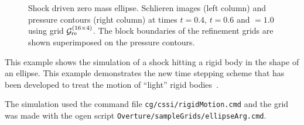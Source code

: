 {\begin{figure}[htb]
\begin{center}
\end{center}
  \caption{Shock driven zero mass ellipse. Schlieren images (left column) and pressure contours (right column)
 at times $t=0.4$, $t=0.6$ and $=1.0$ using grid ${\mathcal G}_{\rm re}^{(16\times 4)}$. The block boundaries of the refinement
   grids are shown superimposed on the pressure contours.}%
  \label{fig:shockDrivenEllipse}
\end{figure}
}


This example shows the simulation of a shock hitting a rigid body in the shape of an ellipse.
This example demonstrates the new time stepping scheme that has been developed
to treat the motion of ``light'' rigid bodies~\cite{lrb2012}.

The simulation used the command file {\tt cg/cssi/rigidMotion.cmd}
and the grid was made with the ogen script {\tt Overture/sampleGrids/ellipseArg.cmd}. 